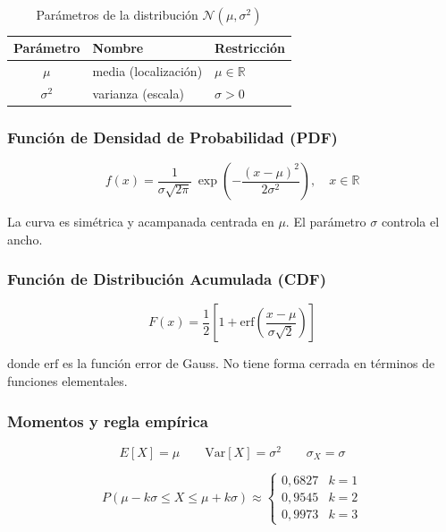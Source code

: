\begin{table}[h!]
\centering
\begin{tabular}{|c|l|l|}
\hline
\textbf{Parámetro} & \textbf{Nombre} & \textbf{Restricción} \\
\hline
$\mu$      & media (localización) & $\mu \in \mathbb{R}$ \\
$\sigma^2$ & varianza (escala)    & $\sigma > 0$ \\
\hline
\end{tabular}
\caption{Parámetros de la distribución $\mathcal{N}(\mu, \sigma^2)$}
\end{table}

\subsubsection{Función de Densidad de Probabilidad (PDF)}

\begin{equation}
f(x) = \frac{1}{\sigma\sqrt{2\pi}}\,
\exp\!\left(-\frac{(x-\mu)^2}{2\sigma^2}\right), \quad x \in \mathbb{R}
\end{equation}

La curva es simétrica y acampanada centrada en $\mu$. El parámetro $\sigma$ controla el ancho.

\subsubsection{Función de Distribución Acumulada (CDF)}

\begin{equation}
F(x) = \frac{1}{2}\left[1 + \mathrm{erf}\!\left(\frac{x - \mu}{\sigma\sqrt{2}}\right)\right]
\end{equation}

donde $\mathrm{erf}$ es la función error de Gauss. No tiene forma cerrada en términos de
funciones elementales.

\subsubsection{Momentos y regla empírica}

\begin{equation}
E[X] = \mu \qquad \text{Var}[X] = \sigma^2 \qquad \sigma_X = \sigma
\end{equation}

\begin{equation}
P(\mu - k\sigma \leq X \leq \mu + k\sigma) \approx
\begin{cases} 0{,}6827 & k = 1 \\ 0{,}9545 & k = 2 \\ 0{,}9973 & k = 3 \end{cases}
\end{equation}

